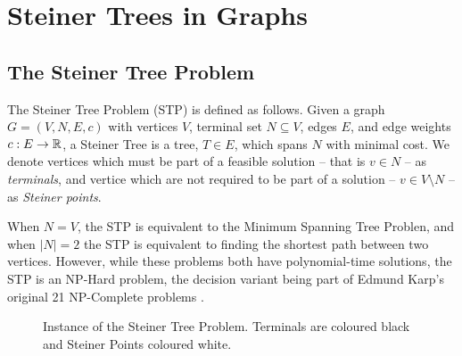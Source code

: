 \chapter{Steiner Trees in Graphs}
\label{chap:steiner-trees}
\tikzset{font=\tiny}

\section{The Steiner Tree Problem}
The Steiner Tree Problem (STP) is defined as follows.
Given a graph $G = (V, N, E, c)$ with vertices $V$, terminal set $N \subseteq V$, edges $E$, and edge weights $c: E \to \mathbb{R}$,
a Steiner Tree is a tree, $T \in E$, which spans $N$ with minimal cost. We denote vertices which must be part of a feasible solution
-- that is $v \in N$ -- as \textit{terminals}, and vertice which are not required to be part of a solution
-- $v \in V \setminus N$ -- as \textit{Steiner points}.

When $N = V$, the STP is equivalent to the Minimum Spanning Tree Problen, and when $|N| = 2$ the STP is equivalent to finding the
shortest path between two vertices. However, while these problems both have polynomial-time solutions, the STP is an NP-Hard problem,
 the decision variant being part of Edmund Karp's original 21 NP-Complete problems \citep{karp1972reducibility}.

\begin{figure}[h]\centering
{}
\caption{Instance of the Steiner Tree Problem. Terminals are coloured black and Steiner Points coloured white.}
\label{fig:stp:01}
\end{figure}

